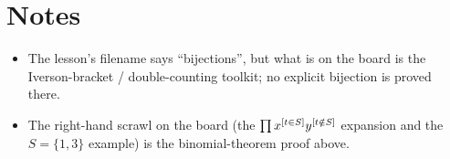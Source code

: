 \documentclass[11pt]{article}
\begin{document}
\section*{Notes}
\begin{itemize}[nosep]
  \item The lesson's filename says ``bijections'', but what is on the board is the Iverson-bracket / double-counting toolkit; no explicit bijection is proved there.
  \item The right-hand scrawl on the board (the $\prod x^{[t\in S]}y^{[t\notin S]}$ expansion and the $S=\{1,3\}$ example) is the binomial-theorem proof above.
\end{itemize}
\end{document}
